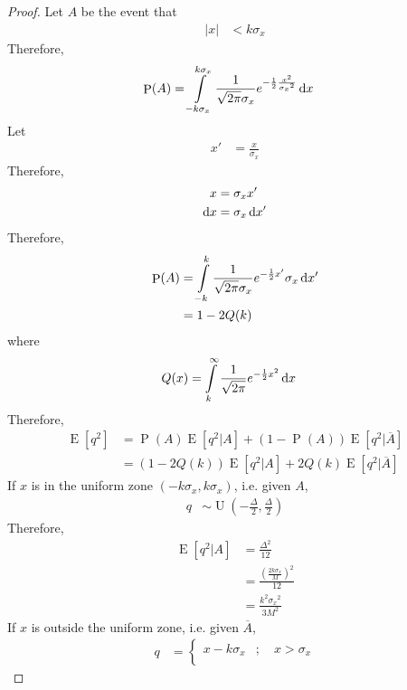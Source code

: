 \documentclass[titlepage, fleqn, a4paper, 12pt, twoside]{article}
\theoremstyle{definition}
\theoremstyle{theorem}
\DeclareMathOperator{\prob}{\mathrm{P}}
\DeclareMathOperator{\expct}{\mathrm{E}}
\DeclareMathOperator{\uniform}{\mathrm{U}}
\begin{document}
\begin{proof}
	Let $A$ be the event that
	\begin{align*}
		|x| &< k \sigma_x
	\end{align*}
	Therefore,
	\begin{align*}
		\prob(A) &= \int\limits_{-k \sigma_x}^{k \sigma_x} \frac{1}{\sqrt{2 \pi} \sigma_x} e^{-\frac{1}{2} \frac{x^2}{{\sigma_x}^2}} \dif x
	\end{align*}
	Let
	\begin{align*}
		x' &= \frac{x}{\sigma_x}
	\end{align*}
	Therefore,
	\begin{align*}
		x &= \sigma_x x'\\
		\dif x &= \sigma_x \dif x'
	\end{align*}
	Therefore,
	\begin{align*}
		\prob(A) &= \int\limits_{-k}^{k} \frac{1}{\sqrt{2 \pi} \sigma_x} e^{-\frac{1}{2} x'} \sigma_x \dif x'\\
		&= 1 - 2 Q(k)
	\end{align*}
	where
	\begin{align*}
		Q(x) &= \int\limits_{k}^{\infty} \frac{1}{\sqrt{2 \pi}} e^{-\frac{1}{2} x^2} \dif x
	\end{align*}
	Therefore,
	\begin{align*}
		\expct\left[ q^2 \right] &= \prob(A) \expct\left[ q^2 \Big| A \right] + \left( 1 - \prob(A) \right) \expct\left[ q^2 \Big| \overline{A} \right]\\
		&= \left( 1 - 2 Q(k) \right) \expct\left[ q^2 \Big| A \right] + 2 Q(k) \expct\left[ q^2 \Big| \overline{A} \right]
	\end{align*}
	If $x$ is in the uniform zone $(-k \sigma_x,k \sigma_x)$, i.e. given $A$,
	\begin{align*}
		q &\sim \uniform\left( -\frac{\Delta}{2},\frac{\Delta}{2} \right)
	\end{align*}
	Therefore,
	\begin{align*}
		\expct\left[ q^2 \Big| A \right] &= \frac{\Delta^2}{12}\\
		&= \frac{\left( \frac{2 k \sigma_x}{M} \right)^2}{12}\\
		&= \frac{k^2 {\sigma_x}^2}{3 M^2}
	\end{align*}
	If $x$ is outside the uniform zone, i.e. given $\overline{A}$,
	\begin{align*}
		q &=
			\begin{cases}
				x - k \sigma_x &;\quad x > \sigma_x\\

\end{cases}
\end{align*}
\end{proof}
\end{document}
